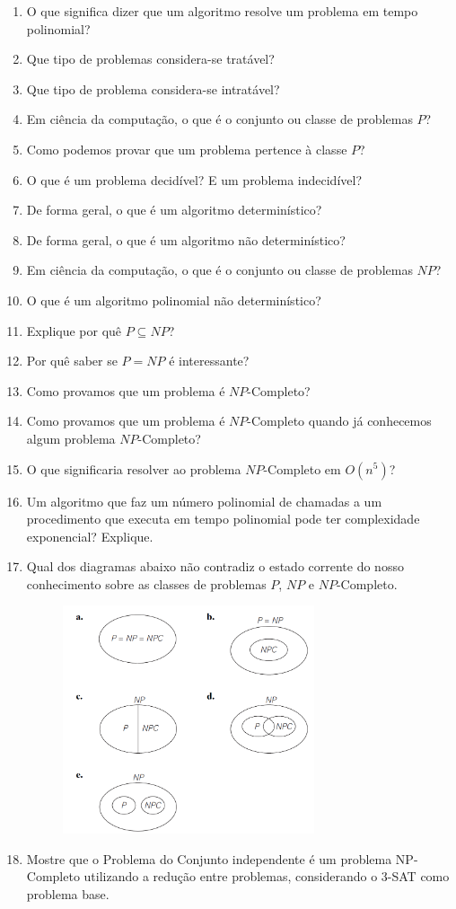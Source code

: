 \documentclass{article}
\begin{document}
\begin{enumerate}
    \item O que significa dizer que um algoritmo resolve um problema em tempo polinomial?
    \item Que tipo de problemas considera-se tratável?
    \item Que tipo de problema considera-se intratável?
    \item Em ciência da computação, o que é o conjunto ou classe de problemas $P$?
    \item Como podemos provar que um problema pertence à classe $P$?
    \item O que é um problema decidível? E um problema indecidível?
    \item De forma geral, o que é um algoritmo determinístico?
    \item De forma geral, o que é um algoritmo não determinístico?
    \item Em ciência da computação, o que é o conjunto ou classe de problemas $NP$?
    \item O que é um algoritmo polinomial não determinístico?
    \item Explique por quê $P \subseteq NP$?
    \item Por quê saber se $P=NP$ é interessante?
    \item Como provamos que um problema é $NP$-Completo?
    \item Como provamos que um problema é $NP$-Completo quando já conhecemos algum problema $NP$-Completo?
    \item O que significaria resolver ao problema $NP$-Completo em $O(n^5)$?
    \item Um algoritmo que faz um número polinomial de chamadas a um procedimento que executa em tempo polinomial pode ter complexidade exponencial? Explique.
    \item Qual dos diagramas abaixo não contradiz o estado corrente do nosso conhecimento sobre as classes de problemas $P$, $NP$ e $NP$-Completo.
        \begin{figure}[!ht]
        \centering
        \includegraphics[width=0.7\textwidth]{Capture.PNG}
        \label{fig:my_label}
    \end{figure}
    \item Mostre que o Problema do Conjunto independente é um problema NP-Completo utilizando a redução entre problemas, considerando o 3-SAT como problema base.
    

\end{enumerate}
\end{document}
